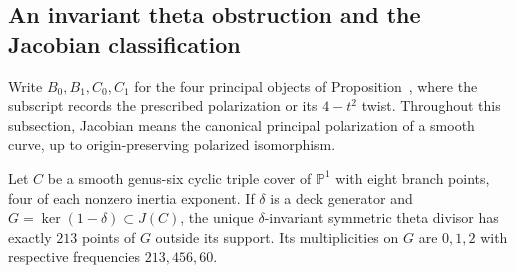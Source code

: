 \subsection{An invariant theta obstruction and the Jacobian classification}
\label{pp:sec:thetacertificate}
Write $B_0,B_1,C_0,C_1$ for the four principal objects of
Proposition~, where the subscript records
the prescribed polarization or its $4-t^2$ twist. Throughout this
subsection, Jacobian means the canonical principal polarization of a
smooth curve, up to origin-preserving polarized isomorphism.

\begin{proposition}
\label{pp:prop:trigonaltheta}
Let $C$ be a smooth genus-six cyclic triple cover of $\mathbb P^1$
with eight branch points, four of each nonzero inertia exponent.
If $\delta$ is a deck generator and $G=\ker(1-\delta)\subset J(C)$,
the unique $\delta$-invariant symmetric theta divisor has exactly
$213$ points of $G$ outside its support. Its multiplicities on $G$
are $0,1,2$ with respective frequencies $213,456,60$.
\end{proposition}
